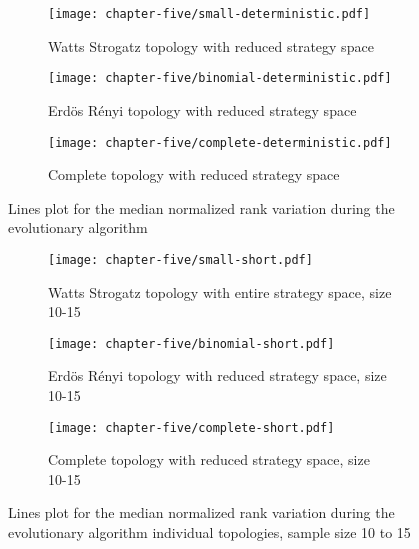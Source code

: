 \begin{figure}[H]
	\centering
	\begin{subfigure}[H]{0.45\textwidth}
		\centering
		\texttt{[image: chapter-five/small-deterministic.pdf]}
		\caption{Watts Strogatz topology with reduced strategy space}
	\end{subfigure}
	\hfill
	\begin{subfigure}[H]{0.45\textwidth}
		\centering
		\texttt{[image: chapter-five/binomial-deterministic.pdf]}
		\caption{Erd\"{o}s R\'{e}nyi topology with reduced strategy space}
	\end{subfigure}
  \hfill
  \begin{subfigure}[H]{0.45\textwidth}
    \centering
    \texttt{[image: chapter-five/complete-deterministic.pdf]}
    \caption{Complete topology with reduced strategy space}
  \end{subfigure}
	\caption{Lines plot for the median normalized rank variation during the evolutionary algorithm}
	\label{fig:line-plots-individuals}
\end{figure}
\begin{figure}[H]
	\centering
	\begin{subfigure}[H]{0.45\textwidth}
		\centering
		\texttt{[image: chapter-five/small-short.pdf]}
		\caption{Watts Strogatz topology with entire strategy space, size 10-15}
	\end{subfigure}
	\hfill
  \begin{subfigure}[H]{0.45\textwidth}
    \centering
    \texttt{[image: chapter-five/binomial-short.pdf]}
    \caption{Erd\"{o}s R\'{e}nyi topology with reduced strategy space, size 10-15}
  \end{subfigure}
  \begin{subfigure}[H]{0.45\textwidth}
    \centering
    \texttt{[image: chapter-five/complete-short.pdf]}
    \caption{Complete topology with reduced strategy space, size 10-15}
  \end{subfigure}
  \hfill
  \caption{Lines plot for the median normalized rank variation during the evolutionary algorithm
           individual topologies, sample size 10 to 15}
	\label{fig:line-plots-individuals-all-short}
\end{figure}

